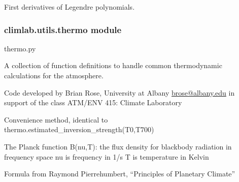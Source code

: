 \documentclass[letterpaper,10pt,english]{sphinxmanual}
\begin{document}

\begin{fulllineitems}
\label{api/climlab.utils:climlab.utils.legendre.Pnprime}
First derivatives of Legendre polynomials.

\end{fulllineitems}



\subsubsection{climlab.utils.thermo module}
\label{api/climlab.utils:climlab-utils-thermo-module}\label{api/climlab.utils:module-climlab.utils.thermo}
thermo.py

A collection of function definitions to handle common
thermodynamic calculations for the atmosphere.

Code developed by Brian Rose, University at Albany
\href{mailto:brose@albany.edu}{brose@albany.edu}
in support of the class ATM/ENV 415: Climate Laboratory

\begin{fulllineitems}
\label{api/climlab.utils:climlab.utils.thermo.EIS}
Convenience method, identical to thermo.estimated\_inversion\_strength(T0,T700)

\end{fulllineitems}


\begin{fulllineitems}
\label{api/climlab.utils:climlab.utils.thermo.Planck_frequency}
The Planck function B(nu,T):
the flux density for blackbody radiation in frequency space
nu is frequency in 1/s
T is temperature in Kelvin

Formula from Raymond Pierrehumbert, ``Principles of Planetary Climate''

\end{fulllineitems}

\end{document}
